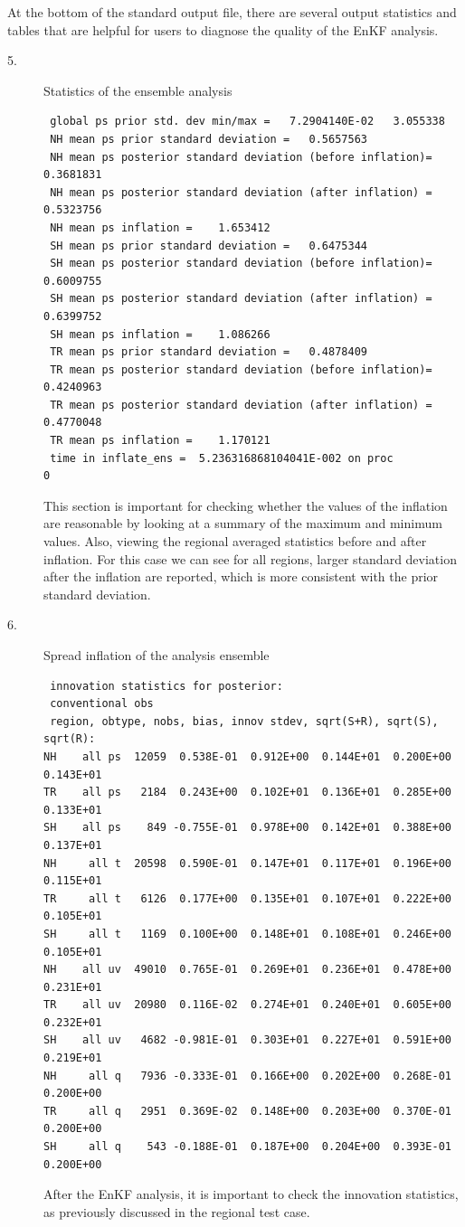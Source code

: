 At the bottom of the standard output file, there are several output statistics and tables that are helpful for users to diagnose the quality of the EnKF analysis.
\begin{description}
\item[5.] Statistics of the ensemble analysis
\begin{footnotesize}
\begin{verbatim}
 global ps prior std. dev min/max =   7.2904140E-02   3.055338
 NH mean ps prior standard deviation =   0.5657563
 NH mean ps posterior standard deviation (before inflation)=   0.3681831
 NH mean ps posterior standard deviation (after inflation) =   0.5323756
 NH mean ps inflation =    1.653412
 SH mean ps prior standard deviation =   0.6475344
 SH mean ps posterior standard deviation (before inflation)=   0.6009755
 SH mean ps posterior standard deviation (after inflation) =   0.6399752
 SH mean ps inflation =    1.086266
 TR mean ps prior standard deviation =   0.4878409
 TR mean ps posterior standard deviation (before inflation)=   0.4240963
 TR mean ps posterior standard deviation (after inflation) =   0.4770048
 TR mean ps inflation =    1.170121
 time in inflate_ens =  5.236316868104041E-002 on proc           0
\end{verbatim}
\end{footnotesize}
This section is important for checking whether the values of the inflation are reasonable by looking at a summary of the maximum and minimum values. Also, viewing the regional averaged statistics before and after inflation. For this case we can see for all regions, larger standard deviation after the inflation are reported, which is more consistent with the prior standard deviation.\\

\item[6.] Spread inflation of the analysis ensemble
\begin{footnotesize}
\begin{verbatim}
 innovation statistics for posterior:
 conventional obs
 region, obtype, nobs, bias, innov stdev, sqrt(S+R), sqrt(S), sqrt(R):
NH    all ps  12059  0.538E-01  0.912E+00  0.144E+01  0.200E+00  0.143E+01
TR    all ps   2184  0.243E+00  0.102E+01  0.136E+01  0.285E+00  0.133E+01
SH    all ps    849 -0.755E-01  0.978E+00  0.142E+01  0.388E+00  0.137E+01
NH     all t  20598  0.590E-01  0.147E+01  0.117E+01  0.196E+00  0.115E+01
TR     all t   6126  0.177E+00  0.135E+01  0.107E+01  0.222E+00  0.105E+01
SH     all t   1169  0.100E+00  0.148E+01  0.108E+01  0.246E+00  0.105E+01
NH    all uv  49010  0.765E-01  0.269E+01  0.236E+01  0.478E+00  0.231E+01
TR    all uv  20980  0.116E-02  0.274E+01  0.240E+01  0.605E+00  0.232E+01
SH    all uv   4682 -0.981E-01  0.303E+01  0.227E+01  0.591E+00  0.219E+01
NH     all q   7936 -0.333E-01  0.166E+00  0.202E+00  0.268E-01  0.200E+00
TR     all q   2951  0.369E-02  0.148E+00  0.203E+00  0.370E-01  0.200E+00
SH     all q    543 -0.188E-01  0.187E+00  0.204E+00  0.393E-01  0.200E+00
\end{verbatim}
\end{footnotesize}
After the EnKF analysis, it is important to check the innovation statistics, as previously discussed in the regional test case.
\end{description}
